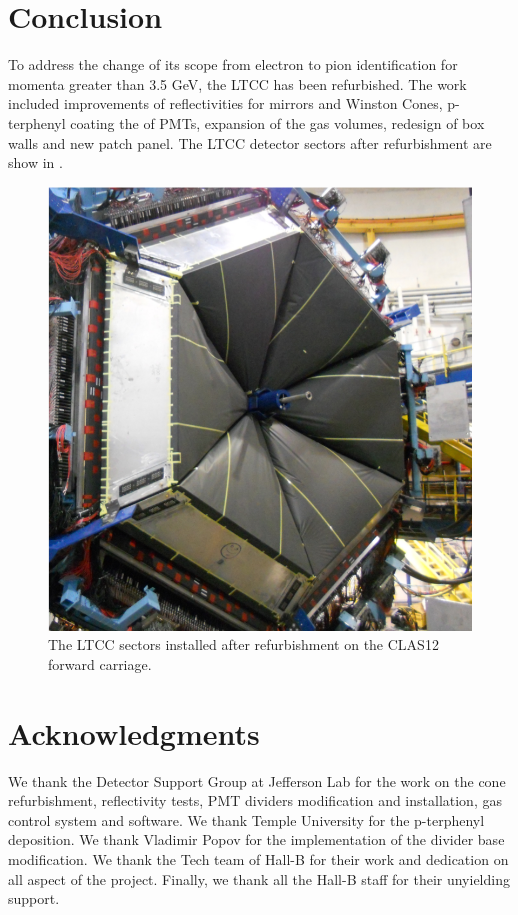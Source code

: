 \section{Conclusion}

To address the change of its scope from electron to pion identification for momenta
greater than 3.5 GeV, the LTCC has been refurbished. The work included improvements of reflectivities for mirrors and Winston Cones, p-terphenyl
coating the of PMTs, expansion of the gas volumes, redesign of box walls and new patch panel.
The LTCC detector sectors after refurbishment are show in .


\begin{figure}
	\centering
	\includegraphics[width=1.0\columnwidth,keepaspectratio]{img/ltccInstalled.png}
	\caption{The LTCC sectors installed after refurbishment on the CLAS12 forward carriage.}
	\label{fig:ltccInstalled}
\end{figure}


\section{Acknowledgments}

We thank the Detector Support Group at Jefferson Lab for the work on the cone refurbishment, reflectivity tests,
PMT dividers modification and installation, gas control system and software.
We thank Temple University for the p-terphenyl deposition. We thank Vladimir Popov for the implementation
of the divider base modification. We thank the Tech team of Hall-B for their work
and dedication on all aspect of the project. Finally, we thank all the Hall-B staff for their unyielding support.


